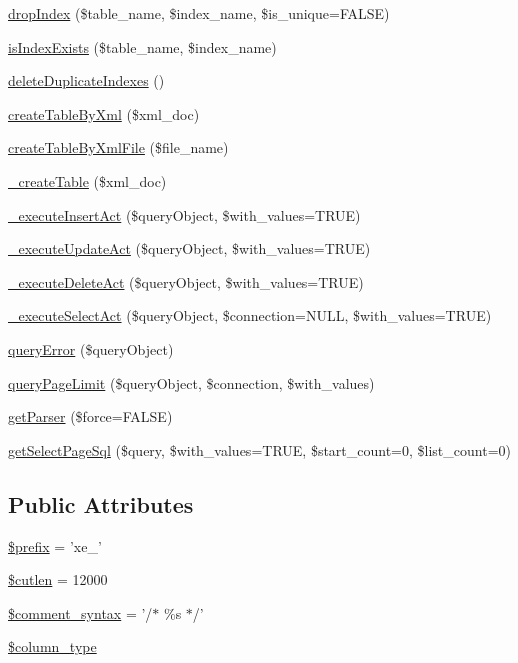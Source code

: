 \begin{DoxyCompactItemize}
\item 
\hyperlink{classDBCubrid_a11876878e4a688f8d3407aaa93ffd86e}{drop\+Index} (\$table\+\_\+name, \$index\+\_\+name, \$is\+\_\+unique=F\+A\+L\+S\+E)
\item 
\hyperlink{classDBCubrid_a75f56bf8e79addb01bc19910e91a2730}{is\+Index\+Exists} (\$table\+\_\+name, \$index\+\_\+name)
\item 
\hyperlink{classDBCubrid_a9035338394680f8400735de946506d85}{delete\+Duplicate\+Indexes} ()
\item 
\hyperlink{classDBCubrid_a63b7c263f7626877bba41d7072562043}{create\+Table\+By\+Xml} (\$xml\+\_\+doc)
\item 
\hyperlink{classDBCubrid_ac94184ec9952bbfee913f3295806fbfe}{create\+Table\+By\+Xml\+File} (\$file\+\_\+name)
\item 
\hyperlink{classDBCubrid_abe5eb360cf9f08ecb9114d082dd24660}{\+\_\+create\+Table} (\$xml\+\_\+doc)
\item 
\hyperlink{classDBCubrid_a64e0e0229136638b2497561cd32432f8}{\+\_\+execute\+Insert\+Act} (\$query\+Object, \$with\+\_\+values=T\+R\+U\+E)
\item 
\hyperlink{classDBCubrid_ae9ac1a643d44ff77e59f07aca99a5983}{\+\_\+execute\+Update\+Act} (\$query\+Object, \$with\+\_\+values=T\+R\+U\+E)
\item 
\hyperlink{classDBCubrid_ac296beebeee54f80e9224f74ec9a0aaa}{\+\_\+execute\+Delete\+Act} (\$query\+Object, \$with\+\_\+values=T\+R\+U\+E)
\item 
\hyperlink{classDBCubrid_a55e0eb703828c9ae33c0903b896926d0}{\+\_\+execute\+Select\+Act} (\$query\+Object, \$connection=N\+U\+L\+L, \$with\+\_\+values=T\+R\+U\+E)
\item 
\hyperlink{classDBCubrid_a42e2cdbc9f4cf75a047a48c42b7bc405}{query\+Error} (\$query\+Object)
\item 
\hyperlink{classDBCubrid_a9a6b86f98f01fb511c6f8f28f0010395}{query\+Page\+Limit} (\$query\+Object, \$connection, \$with\+\_\+values)
\item 
\hyperlink{classDBCubrid_a9c9bbb9e0958527af5e3ebcfb427b496}{get\+Parser} (\$force=F\+A\+L\+S\+E)
\item 
\hyperlink{classDBCubrid_ace7731acbdb4ed72497be48092b0997f}{get\+Select\+Page\+Sql} (\$query, \$with\+\_\+values=T\+R\+U\+E, \$start\+\_\+count=0, \$list\+\_\+count=0)
\end{DoxyCompactItemize}
\subsection*{Public Attributes}
\begin{DoxyCompactItemize}
\item 
\hyperlink{classDBCubrid_a78aa323ac3bf494cbc63d3a2ae05a6f5}{\$prefix} = 'xe\+\_\+'
\item 
\hyperlink{classDBCubrid_a0f61a81aecf7cd9829d0fc390b2895a5}{\$cutlen} = 12000
\item 
\hyperlink{classDBCubrid_a0060c7dcaf443efddbe4492d4479fe0b}{\$comment\+\_\+syntax} = '/$\ast$ \%s $\ast$/'
\item 
\hyperlink{classDBCubrid_a92995e5eed892ec4076cb3c1f5fdb2f1}{\$column\+\_\+type}
\end{DoxyCompactItemize}
